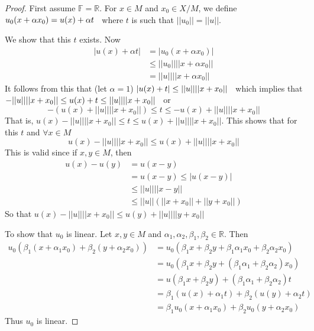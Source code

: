 \documentclass[11pt,a4paper]{article}
\theoremstyle{definition}
\begin{document}
\begin{proof}
First assume $\mathbb{F}=\mathbb{R}$. For $x\in M$ and $x_0\in X/M$, we define \hspace{0.2cm}$u_0(x+\alpha x_0)=u(x)+\alpha t\hspace{0.2cm}$ where $t$ is such that $||u_0||=||u||$.

We show that this $t$ exists.  Now
\begin{align*}
|u(x)+\alpha t| &=|u_0(x+\alpha x_0)|\\
                &\leq ||u_0||||x+\alpha x_0||\\
                &=||u||||x+\alpha x_0||
\end{align*}
It follows from this that (let $\alpha =1$) \hspace{0.2cm}$|u(x)+t|\leq ||u||||x+x_0||\hspace{0.2cm}$ which implies that\\ $-||u||||x+x_0||\leq u(x)+t\leq ||u||||x+x_0||\hspace{0.2cm}$ or $$-(u(x)+||u||||x+x_0||)\leq t\leq -u(x)+||u||||x+x_0||$$ That is, \hspace{0.2cm}$u(x)-||u||||x+x_0||\leq t\leq u(x)+||u||||x+x_0||$.  This shows that for this $t$ and $\forall x\in M$ $$u(x)-||u||||x+x_0||\leq u(x)+||u||||x+x_0||$$ This is valid since if $x,y\in M$, then
\begin{align*}
u(x)-u(y) &=u(x-y)\\
          &=u(x-y)\leq |u(x-y)|\\
          &\leq ||u||||x-y||\\
          &\leq ||u||(||x+x_0||+||y+x_0||)
\end{align*}
So that \hspace{0.2cm}$u(x)-||u||||x+x_0||\leq u(y)+||u||||y+x_0||$

To show that $u_0$ is linear. Let $x,y\in M$ and $\alpha_1, \alpha_2, \beta_1, \beta_2 \in \mathbb{R}$. Then
\begin{align*}
u_0(\beta_1(x+\alpha_1x_0)+\beta_2(y+\alpha_2 x_0)) &=u_0(\beta_1 x+\beta_2 y+\beta_1 \alpha_1 x_0+\beta_2 \alpha_2 x_0)\\
                                                    &=u_0(\beta_1 x+\beta_2 y+(\beta_1 \alpha_1 +\beta_2 \alpha_2)x_0)\\
                                                    &=u(\beta_1 x+\beta_2 y)+(\beta_1 \alpha_1 +\beta_2 \alpha_2)t\\
                                                    &=\beta_1 (u(x)+\alpha_1 t)+\beta_2 (u(y)+\alpha_2 t)\\
                                                    &=\beta_1 u_0(x+\alpha_1 x_0)+\beta_2 u_0(y+\alpha_2 x_0)
\end{align*}
Thus $u_0$ is linear.


\end{proof}
\end{document}

